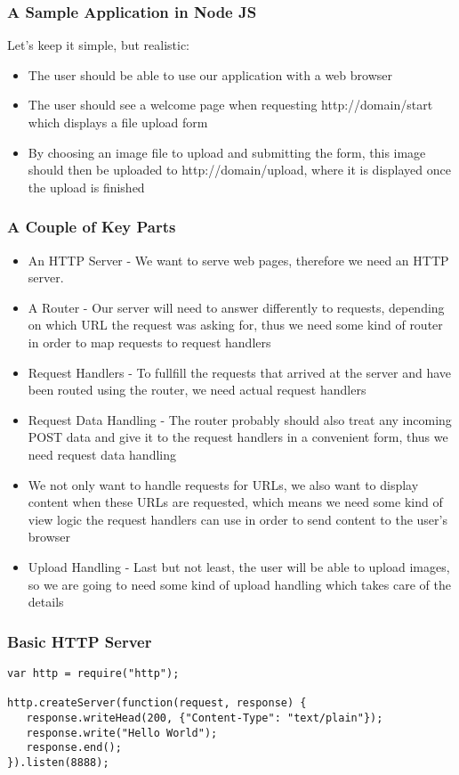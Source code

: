\documentclass[ignorenonframetext,]{beamer}
\begin{document}
\begin{frame}\frametitle{A Sample Application in Node JS}

Let's keep it simple, but realistic:

\begin{itemize}
\item
  The user should be able to use our application with a web browser
\item
  The user should see a welcome page when requesting http://domain/start
  which displays a file upload form
\item
  By choosing an image file to upload and submitting the form, this
  image should then be uploaded to http://domain/upload, where it is
  displayed once the upload is finished
\end{itemize}
\end{frame}

\begin{frame}\frametitle{A Couple of Key Parts}

\begin{itemize}
\item
  An HTTP Server - We want to serve web pages, therefore we need an HTTP
  server.
\item
  A Router - Our server will need to answer differently to requests,
  depending on which URL the request was asking for, thus we need some
  kind of router in order to map requests to request handlers
\item
  Request Handlers - To fullfill the requests that arrived at the server
  and have been routed using the router, we need actual request handlers
\item
  Request Data Handling - The router probably should also treat any
  incoming POST data and give it to the request handlers in a convenient
  form, thus we need request data handling
\item
  We not only want to handle requests for URLs, we also want to display
  content when these URLs are requested, which means we need some kind
  of view logic the request handlers can use in order to send content to
  the user's browser
\item
  Upload Handling - Last but not least, the user will be able to upload
  images, so we are going to need some kind of upload handling which
  takes care of the details
\end{itemize}
\end{frame}

\begin{frame}[fragile]\frametitle{Basic HTTP Server}

\begin{verbatim}
var http = require("http");

http.createServer(function(request, response) {
   response.writeHead(200, {"Content-Type": "text/plain"});
   response.write("Hello World");
   response.end();
}).listen(8888);
\end{verbatim}
\end{frame}
\end{document}
